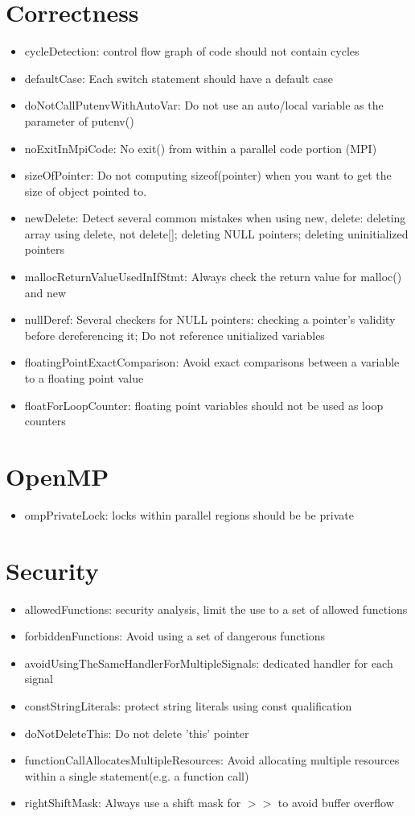\section{Correctness}
\begin{itemize}
\item cycleDetection: control flow graph of code should not contain cycles
\item defaultCase: Each switch statement should have a default case
\item doNotCallPutenvWithAutoVar: Do not use an auto/local variable as the parameter of putenv()
\item noExitInMpiCode: No exit() from within a parallel code portion (MPI)
\item sizeOfPointer: Do not computing sizeof(pointer) when you want to get the size of object pointed to. 
\item newDelete: Detect several common mistakes when using new, delete: deleting array using delete, not delete[]; deleting NULL pointers; deleting uninitialized pointers
\item mallocReturnValueUsedInIfStmt: Always check the return value for malloc() and new
\item nullDeref: Several checkers for NULL pointers: checking a pointer's validity before dereferencing it; Do not reference unitialized variables
\item floatingPointExactComparison: Avoid exact comparisons between a variable to a floating point value
\item floatForLoopCounter:  floating point variables should not be used as loop counters
\end{itemize}

\section{OpenMP}
\begin{itemize}
\item ompPrivateLock: locks within parallel regions should be be private
\end{itemize}

\section{Security}
\begin{itemize}
\item allowedFunctions: security analysis, limit the use to a set of allowed functions
\item forbiddenFunctions: Avoid using a set of dangerous functions
\item avoidUsingTheSameHandlerForMultipleSignals: dedicated handler for each signal
\item constStringLiterals: protect string literals using const qualification
\item doNotDeleteThis: Do not delete 'this' pointer
\item functionCallAllocatesMultipleResources: Avoid allocating multiple resources within a single statement(e.g. a function call)
\item rightShiftMask: Always use a shift mask for $>>$ to avoid buffer overflow
\end{itemize}

